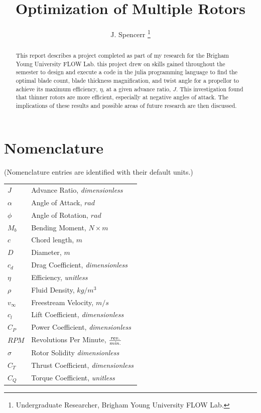 \documentclass[journal ]{new-aiaa}
\title{Optimization of Multiple Rotors}
\author{J. Spencerr \footnote{Undergraduate Researcher, Brigham Young University FLOW Lab.}}
\affil{Brigham Young University, Provo, Utah, 84601}
\begin{document}
\maketitle

\begin{abstract}
This report describes a project completed as part of my research for the Brigham Young University FLOW Lab. this project drew on skills gained throughout the semester to design and execute a code in the julia programming language to find the optimal blade count, blade thickness magnification, and twist angle for a propellor to achieve its maximum efficiency, $\eta$, at a given advance ratio, $J$. This investigation found that thinner rotors are more efficient, especially at negative angles of attack. The implications of these results and possible areas of future research are then discussed.

\end{abstract}


\section*{Nomenclature}

\noindent(Nomenclature entries are identified with their default units.)

{\renewcommand\arraystretch{1.0}
\noindent\begin{longtable*}{@{}l @{\quad=\quad} l@{}}

$J$ & Advance Ratio, \emph{dimensionless} \\
$\alpha$ & Angle of Attack, $rad$ \\
$\phi$ & Angle of Rotation, $rad$ \\
$M_{b}$ & Bending Moment, $N \times m$ \\
$c$ & Chord length, $m$ \\
$D$ & Diameter, $m$ \\
$c_{d}$ & Drag Coefficient, \emph{dimensionless} \\
$\eta$ & Efficiency, \emph{unitless} \\
$\rho$ & Fluid Density, $kg/m^{3}$ \\
$v_{\infty}$ & Freestream Velocity, $m/s$ \\
$c_{l}$ & Lift Coefficient, \emph{dimensionless} \\
$C_{P}$ & Power Coefficient, \emph{dimensionless} \\
$RPM$ & Revolutions Per Minute, $\frac{\emph{rev.}}{\emph{min.}}$ \\
$\sigma$ & Rotor Solidity \emph{dimensionless} \\
$C_{T}$ & Thrust Coefficient, \emph{dimensionless} \\
$C_{Q}$ & Torque Coefficient, \emph{unitless} \\

\end{longtable*}}
\end{document}
